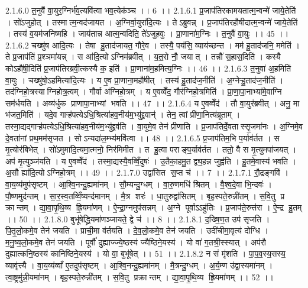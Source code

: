 2.1.6.0
त॒नुवै॑ वा॒युर॒ग्निर्भ॑व॒त्यवि॑त्वा भव॒त्येक॑ञ्च ।। 6 ।।
2.1.6.1
प्र॒जाप॑तिरकामयतात्म॒न्वन्मे॑ जाये॒तेति॑ । सो॑ऽजुहोत् । तस्मात्म॒न्वद॑जायत । अ॒ग्निर्वा॒युरा॑दि॒त्यः । तेऽब्रुवन्न् । प्र॒जाप॑तिरहौषीदात्म॒न्वन्मे॑ जाये॒तेति॑ । तस्य॑ व॒यम॑जनिष्महि । जाय॑तान्न आत्म॒न्वदिति॒ ते॑ऽजुहवुः । प्रा॒णाना॑म॒ग्निः । त॒नुवै॑ वा॒युः ।। 45 ।।
2.1.6.2
चख्षु॑ष आदि॒त्यः । तेषा॑ हु॒ताद॑जायत॒ गौरे॒व । तस्यै॒ पय॑सि॒ व्याय॑च्छन्त । मम॑ हु॒ताद॑जनि॒ ममेति॑ । ते प्र॒जाप॑तिं प्र॒श्ञमा॑यन्न् । स आ॑दि॒त्योऽग्निम॑ब्रवीत् । य॒त॒रो नौ॒ जयात् । तन्नौ॑ स॒हास॒दिति॑ । कस्यै कोऽहौ॑षी॒दिति॑ प्र॒जाप॑तिरब्रवी॒त्कस्यै क॒ इति॑ । प्रा॒णाना॑म॒हमित्य॒ग्निः ।। 46 ।।
2.1.6.3
त॒नुवा॑ अ॒हमिति॑ वा॒युः । चख्षु॑षो॒ऽहमित्या॑दि॒त्यः । य ए॒व प्रा॒णाना॒महौ॑षीत् । तस्य॑ हु॒ताद॑ज॒नीति॑ । अ॒ग्नेऱ्हु॒ताद॑ज॒नीति॑ । तद॑ग्निहो॒त्रस्याग्निहोत्र॒त्वम् । गौर्वा अ॑ग्निहो॒त्रम् । य ए॒वव्वेँद॒ गौर॑ग्निहो॒त्रमिति॑ । प्रा॒णा॒पा॒नाभ्या॑मे॒वाग्नि सम॑र्धयति । अव्य॑र्धुक प्राणापा॒नाभ्यां भवति ।। 47 ।।
2.1.6.4
य ए॒वव्वेँद॑ । तौ वा॒युर॑ब्रवीत् । अनु॒ मा भ॑जत॒मिति॑ । यदे॒व गाऱ्ह॑पत्येऽधि॒श्रित्या॑हव॒नीय॑म॒भ्यु॑द्द्रवान्॑ । तेन॒ त्वां प्री॑णा॒नित्य॑ब्रूताम् । तस्मा॒द्यद्गाऱ्ह॑पत्येऽधि॒श्रित्या॑हव॒नीय॑म॒भ्यु॑द्द्रव॑ति । वा॒युमे॒व तेन॑ प्रीणाति । प्र॒जाप॑तिर्दे॒वतास्सृ॒जमा॑नः । अ॒ग्निमे॒व दे॒वता॑नां प्रथ॒मम॑सृजत । सोऽन्यदा॑ल॒म्भ्य॑मवि॑त्वा ।। 48 ।।
2.1.6.5
प्र॒जाप॑तिम॒भि प॒र्याव॑र्तत । स मृ॒त्योर॑बिभेत् । सो॑ऽमुमा॑दि॒त्यमा॒त्मनो॒ निर॑मिमीत । त हु॒त्वा पराङ्प॒र्याव॑र्तत । ततो॒ वै स मृ॒त्युमपा॑जयत् । अप॑ मृ॒त्युञ्ज॑यति । य ए॒वव्वेँद॑ । तस्मा॒द्यस्यै॒वव्विँ॒दुषः॑ । उ॒तैका॒हमु॒त द्व्य॒हन्न जुह्व॑ति । हु॒तमे॒वास्य॑ भवति । अ॒सौ ह्या॑दि॒त्योऽग्निहो॒त्रम् ।। 49 ।।
2.1.7.0
उद्वा॑सित स॒प्त च॑ ।। 7 ।।
2.1.7.1
रौ॒द्रङ्गवि॑ । वा॒य॒व्य॑मुप॑सृष्टम् । आ॒श्वि॒नन्दु॒ह्यमा॑नम् । सौ॒म्यन्दु॒ग्धम् । वा॒रु॒णमधि॑ श्रितम् । वै॒श्व॒दे॒वा भि॒न्दवः॑ । पौ॒ष्णमुद॑न्तम् । सा॒र॒स्व॒तव्विँ॒ष्यन्द॑मानम् । मै॒त्र शरः॑ । धा॒तुरुद्वा॑सितम् । बृह॒स्पते॒रुन्नी॑तम् । स॒वि॒तु प्र क्रान्तम् । द्या॒वा॒पृ॒थि॒व्य॑ ह्रि॒यमा॑णम् । ऐ॒न्द्रा॒ग्नमुप॑सन्नम् । अ॒ग्ने पूर्वाऽऽहु॑तिः । प्र॒जाप॑ते॒रुत्त॑रा । ऐ॒न्द्र हु॒तम् ।। 50 ।।
2.1.8.0
बुभू॑षेद्ध्रि॒यमा॑णञ्जायते॒ द्वे च॑ ।। 8 ।।
2.1.8.1
द॒ख्षि॒ण॒त उप॑ सृजति । पि॒तृ॒लो॒कमे॒व तेन॑ जयति । प्राची॒मा व॑र्तयति । दे॒व॒लो॒कमे॒व तेन॑ जयति । उदी॑चीमा॒वृत्य॑ दोग्धि । म॒नु॒ष्य॒लो॒कमे॒व तेन॑ जयति । पूर्वौ॑ दुह्याज्ज्ये॒ष्ठस्य॑ ज्यैष्ठिने॒यस्य॑ । यो वा॑ ग॒तश्री॒स्स्यात् । अप॑रौ दुह्यात्कनि॒ष्ठस्य॑ कानिष्ठिने॒यस्य॑ । यो वा॒ बुभू॑षेत् ।। 51 ।।
2.1.8.2
न सं मृ॑शति । पा॒प॒व॒स्य॒सस्य॒ व्यावृ॑त्त्यै । वा॒य॒व्य॑व्वाँ ए॒तदुप॑सृष्टम् । आ॒श्वि॒नन्दु॒ह्यमा॑नम् । मै॒त्रन्दु॒ग्धम् । अ॒र्य॒म्ण उ॑द्वा॒स्यमा॑नम् । त्वा॒ष्ट्रमु॑न्नी॒यमा॑नम् । बृह॒स्पते॒रुन्नी॑तम् । स॒वि॒तु प्रक्रान्तम् । द्या॒वा॒पृ॒थि॒व्य॑ ह्रि॒यमा॑णम् ।। 52 ।।
